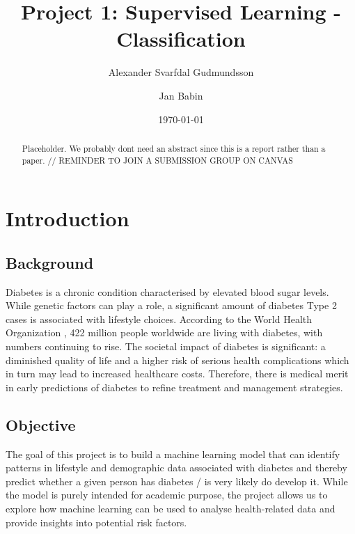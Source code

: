 \documentclass[a4paper,12pt]{article}
\title{Project 1: Supervised Learning - Classification}
\author{Alexander Svarfdal Gudmundsson \and Jan Babin}
\date{\today}
\begin{document}
\maketitle

\begin{abstract}
Placeholder. We probably dont need an abstract since this is a report rather than a paper.
// REMINDER TO JOIN A SUBMISSION GROUP ON CANVAS
\end{abstract}

\section{Introduction}
\subsection{Background}
Diabetes is a chronic condition characterised by elevated blood sugar levels. While genetic factors 
can play a role, a significant amount of diabetes Type 2 cases is associated with lifestyle choices. 
According to the World Health Organization \cite{WHO2016}, 422 million people worldwide 
are living with diabetes, with numbers continuing to rise. The societal impact of diabetes is 
significant: a diminished quality of life and a higher risk of serious health complications which in 
turn may lead to increased healthcare costs. Therefore, there is medical merit in
early predictions of diabetes to refine treatment and management strategies.

\subsection{Objective}
The goal of this project is to build a machine learning model that can identify 
patterns in lifestyle and demographic data associated with diabetes and thereby predict whether
a given person has diabetes / is very likely do develop it. While the 
model is purely intended for academic purpose, the project allows us to 
explore how machine learning can be used to analyse health-related data and 
provide insights into potential risk factors.
\end{document}
